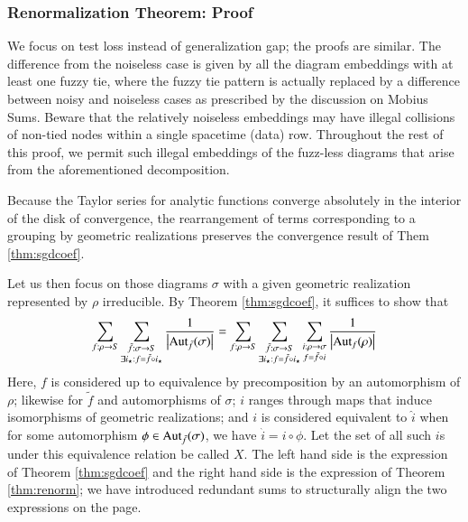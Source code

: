 \documentclass{article}
\theoremstyle{plain}
\theoremstyle{definition}
\newcommand{\wabs}[1]{\left|#1\right|}
\newcommand{\Aut}{\text{\textnormal{Aut}}}
\begin{document}
        \subsubsection*{Renormalization Theorem: Proof}
            We focus on test loss instead of generalization gap; the proofs are
            similar. The
            difference from the noiseless case is given by all the diagram
            embeddings with at least one fuzzy tie, where the fuzzy tie pattern
            is actually replaced by a difference between noisy and noiseless
            cases as prescribed by the discussion on Mobius Sums.
            Beware that the relatively noiseless embeddings may have illegal
            collisions of non-tied nodes within a single spacetime (data) row.
            Throughout the rest of this proof, we permit such illegal
            embeddings of the fuzz-less diagrams that arise from the
            aforementioned decomposition.  

            Because the Taylor series for analytic functions converge
            absolutely in the interior of the disk of convergence, the
            rearrangement of terms corresponding to a grouping by geometric
            realizations preserves the convergence result of Them
            \ref{thm:sgdcoef}.  

            Let us then focus on those diagrams $\sigma$ with a given geometric
            realization represented by $\rho$ irreducible.  By Theorem
            \ref{thm:sgdcoef}, it suffices to show that
            \begin{equation} \label{eq:hard}
                \sum_{f:\rho\to S}
                \sum_{\substack{
                    \tilde f:\sigma\to S \\
                    \exists i_\star: f=\tilde f \circ i_\star
                }}
                \frac{1}{\wabs{\Aut_{\tilde f}(\sigma)}}
                =
                \sum_{f:\rho\to S}
                \sum_{\substack{
                    \tilde f:\sigma\to S \\
                    \exists i_\star: f=\tilde f \circ i_\star
                }}
                \sum_{\substack{
                    i:\rho\to\sigma \\
                    f = \tilde f \circ i
                }}
                \frac{1}{\wabs{\Aut_{f}(\rho)}}
            \end{equation}
            Here, $f$ is considered up to equivalence by precomposition by an
            automorphism of $\rho$; likewise for $\tilde f$ and automorphisms
            of $\sigma$; $i$ ranges through maps that induce isomorphisms of
            geometric realizations; and $i$ is considered equivalent to $\hat
            i$ when for some automorphism $\phi \in \Aut_{\tilde f}(\sigma)$,
            we have $\hat i = i \circ \phi$.  Let the set of all such $i$s
            under this equivalence relation be called $X$.  The left hand side
            is the expression of Theorem \ref{thm:sgdcoef} and the right hand
            side is the expression of Theorem \ref{thm:renorm}; we have
            introduced redundant sums to structurally align the two expressions
            on the page.
\end{document}
